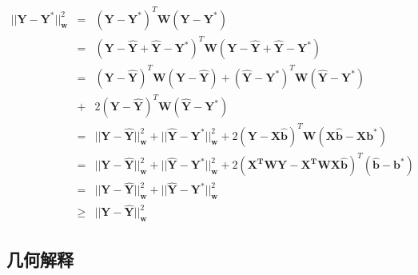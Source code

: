 \begin{equation}
    \begin{array}{rcl}
        ||\bm{Y} - \bm{Y^*}||_{\bm{w}}^2 & =    & (\bm{Y} - \bm{Y^*})^T\bm{W}(\bm{Y} - \bm{Y^*})                                                                                                  \\
                                         & =    & (\bm{Y} - \bm{\hat{Y}} + \bm{\hat{Y}} - \bm{Y^*})^T\bm{W}(\bm{Y} - \bm{\hat{Y}} + \bm{\hat{Y}} - \bm{Y^*})                                      \\
                                         & =    & (\bm{Y} - \bm{\hat{Y}})^T\bm{W}(\bm{Y} - \bm{\hat{Y}}) + (\bm{\hat{Y}} - \bm{Y^*})^T\bm{W}(\bm{\hat{Y}} - \bm{Y^*})                             \\
                                         & +    & 2(\bm{Y} - \bm{\hat{Y}})^T\bm{W}(\bm{\hat{Y}} - \bm{Y^*})                                                                                       \\
                                         & =    & || \bm{Y} - \bm{\hat{Y}} ||_{\bm{w}}^2 + || \bm{\hat{Y}} - \bm{Y^*}||_{\bm{w}}^2 + 2(\bm{Y} - \bm{X\hat{b}})^T\bm{W}(\bm{X\hat{b}} - \bm{Xb^*}) \\
                                         & =    & || \bm{Y} - \bm{\hat{Y}} ||_{\bm{w}}^2 + || \bm{\hat{Y}} - \bm{Y^*}||_{\bm{w}}^2 + 2(\bm{X^TWY} - \bm{X^TWX\hat{b}})^T(\bm{\hat{b}} - \bm{b^*}) \\
                                         & =    & || \bm{Y} - \bm{\hat{Y}} ||_{\bm{w}}^2 + || \bm{\hat{Y}} - \bm{Y^*}||_{\bm{w}}^2                                                                \\
                                         & \geq & || \bm{Y} - \bm{\hat{Y}} ||_{\bm{w}}^2
    \end{array}
\end{equation}

\subsection{几何解释}

